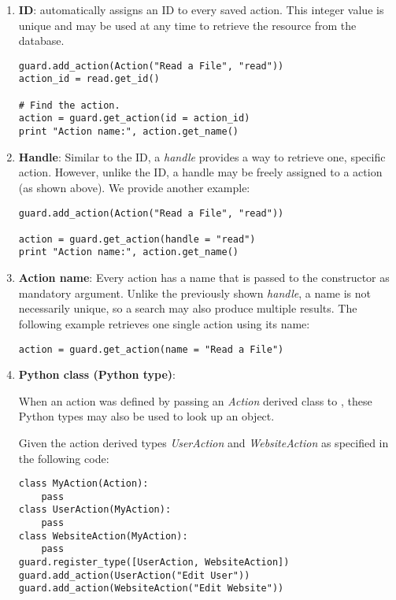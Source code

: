 \begin{enumerate}
\item {\bf ID}: \product automatically assigns an ID to every saved action. 
This integer value is unique and may be used at any time to retrieve the 
resource from the database.

\begin{lstlisting}
guard.add_action(Action("Read a File", "read"))
action_id = read.get_id()

# Find the action.
action = guard.get_action(id = action_id)
print "Action name:", action.get_name()
\end{lstlisting}

\item {\bf Handle}: Similar to the ID, a {\it handle} provides a way to 
retrieve one, specific action. However, unlike the ID, a handle may be 
freely assigned to a action (as shown above). We provide another example:

\begin{lstlisting}
guard.add_action(Action("Read a File", "read"))

action = guard.get_action(handle = "read")
print "Action name:", action.get_name()
\end{lstlisting}

\item {\bf Action name}: Every action has a name that is passed to 
the constructor as mandatory argument. Unlike the previously shown
{\it handle}, a name is not necessarily unique, so a search may also 
produce multiple results. The following example retrieves one single 
action using its name:

\begin{lstlisting}
action = guard.get_action(name = "Read a File")
\end{lstlisting}

\item {\bf Python class (Python type)}: 

When an action was defined by passing an {\it Action} derived class to 
\product, these Python types may also be used to look up an object.

Given the action derived types {\it UserAction} and {\it WebsiteAction} as 
specified in the following code:

\begin{lstlisting}
class MyAction(Action):
    pass
class UserAction(MyAction):
    pass
class WebsiteAction(MyAction):
    pass
guard.register_type([UserAction, WebsiteAction])
guard.add_action(UserAction("Edit User"))
guard.add_action(WebsiteAction("Edit Website"))
\end{lstlisting}


\end{enumerate}
